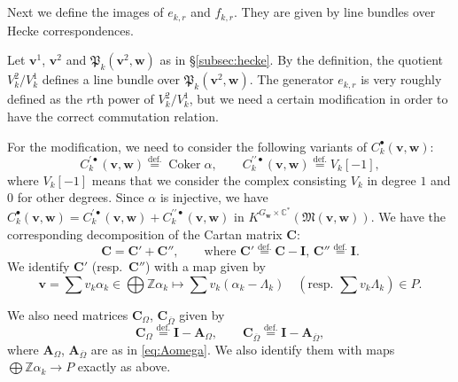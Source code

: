 \documentclass[12pt]{amsart}
\def\Bbb{\mathbb}
\def\frak{\mathfrak}
\theoremstyle{definition}
\theoremstyle{remark}
\numberwithin{equation}{subsection}
\newcommand{\subsecref}[1]{\S\ref{#1}}
\newcommand{\defeq}{\overset{\operatorname{\scriptstyle def.}}{=}}
\newcommand{\C}{{\Bbb C}}
\newcommand{\Z}{{\Bbb Z}}
\newcommand{\Coker}{\operatorname{Coker}}
\newcommand{\M}{{\frak M}} %
\newcommand{\bv}{{\mathbf v}} %
\newcommand{\bw}{{\mathbf w}} %
\newcommand{\bC}{{\mathbf C}} %
\newcommand{\bA}{{\mathbf A}} %
\newcommand{\bI}{{\mathbf I}} %
\newcommand{\Pa}{{\frak P}} %
\begin{document}
\subsection{}

Next we define the images of $e_{k,r}$ and $f_{k,r}$. They are given
by line bundles over Hecke correspondences.

Let $\bv^1$, $\bv^2$ and $\Pa_k(\bv^2,\bw)$ as in
\subsecref{subsec:hecke}.
%
By the definition, the quotient $V_k^2/V_k^1$ defines a line bundle
over $\Pa_k(\bv^2,\bw)$.
The generator $e_{k,r}$ is very roughly defined as the $r$th power of
$V_k^2/V_k^1$, but we need a certain modification in order to have
the correct commutation relation.

For the modification, we need to consider the
following variants of $C^\bullet_k(\bv,\bw)$:
\begin{equation}\label{eq:mod_taut_cpx}
  C^{\prime\bullet}_k(\bv,\bw) \defeq \Coker\alpha ,
  \qquad
  C^{\prime\prime\bullet}_k(\bv,\bw) \defeq V_k[-1],
\end{equation}
where $V_k[-1]$ means that we consider the complex consisting $V_k$ in 
degree $1$ and $0$ for other degrees.
Since $\alpha$ is injective, we have
\(
  C^\bullet_k(\bv,\bw) = C^{\prime\bullet}_k(\bv,\bw) +
  C^{\prime\prime\bullet}_k(\bv,\bw)
\)
in $K^{G_\bw\times\C^*}(\M(\bv,\bw))$. We have the corresponding
decomposition of the Cartan matrix $\bC$:
\begin{equation*}
  \bC = \bC' + \bC'',
  \qquad\text{where
  $\bC' \defeq \bC - \bI$, $\bC'' \defeq \bI$.}
\end{equation*}
We identify $\bC'$ (resp.\ $\bC''$) with a map given by
\begin{equation*}
   \bv = \sum v_k \alpha_k \in \bigoplus \Z\alpha_k
   \mapsto \sum v_k (\alpha_k - \Lambda_k) \quad
   \left(\text{resp.\ }\sum v_k \Lambda_k\right) \in P.
\end{equation*}

We also need matrices $\bC_\Omega$, $\bC_{\overline\Omega}$ given by
\begin{equation*}
   \bC_\Omega \defeq \bI - \bA_\Omega, \qquad
   \bC_{\overline\Omega} \defeq \bI - \bA_{\overline\Omega},
\end{equation*}
where $\bA_\Omega$, $\bA_{\overline\Omega}$ are as in
\eqref{eq:Aomega}. We also identify them with maps
$\bigoplus \Z\alpha_k \to P$ exactly as above.
\end{document}
